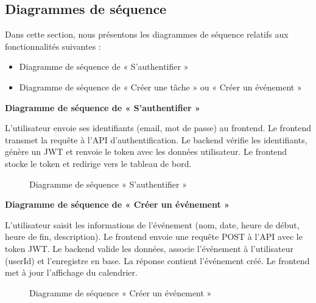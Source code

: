 \subsection{Diagrammes de séquence}

Dans cette section, nous présentons les diagrammes de séquence relatifs aux fonctionnalités suivantes :
\begin{itemize}[label=\textbullet]
\item Diagramme de séquence de « S'authentifier »
\item Diagramme de séquence de « Créer une tâche » ou « Créer un événement »
\end{itemize}

\vspace{0.4cm}
\textbf{Diagramme de séquence de « S'authentifier »}

L'utilisateur envoie ses identifiants (email, mot de passe) au frontend. Le frontend transmet la requête à l'API d'authentification. Le backend vérifie les identifiants, génère un JWT et renvoie le token avec les données utilisateur. Le frontend stocke le token et redirige vers le tableau de bord.

\vspace{0.4cm}
\begin{figure}[H]
\centering
\caption{Diagramme de séquence « S'authentifier »}
\label{inscSE1}
\end{figure}

\vspace{0.4cm}
\textbf{Diagramme de séquence de « Créer un événement »}

L'utilisateur saisit les informations de l'événement (nom, date, heure de début, heure de fin, description). Le frontend envoie une requête POST à l'API avec le token JWT. Le backend valide les données, associe l'événement à l'utilisateur (userId) et l'enregistre en base. La réponse contient l'événement créé. Le frontend met à jour l'affichage du calendrier.

\begin{figure}[H]
\centering
\caption{Diagramme de séquence « Créer un événement »}
\label{authSE16}
\end{figure}

